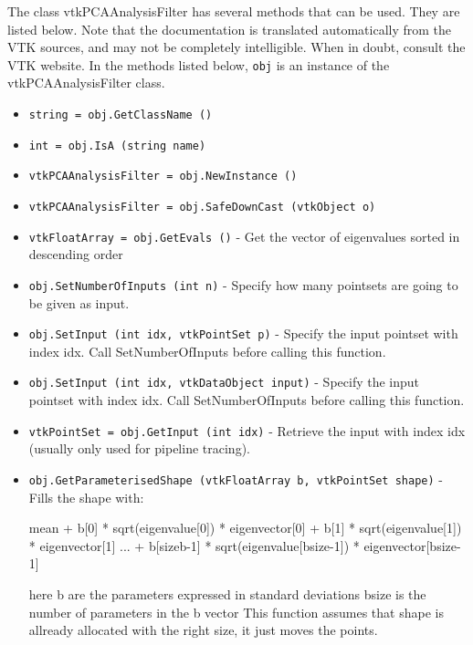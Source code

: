 The class vtkPCAAnalysisFilter has several methods that can be used.
  They are listed below.
Note that the documentation is translated automatically from the VTK sources,
and may not be completely intelligible.  When in doubt, consult the VTK website.
In the methods listed below, \verb|obj| is an instance of the vtkPCAAnalysisFilter class.
\begin{itemize}
\item  \verb|string = obj.GetClassName ()|

\item  \verb|int = obj.IsA (string name)|

\item  \verb|vtkPCAAnalysisFilter = obj.NewInstance ()|

\item  \verb|vtkPCAAnalysisFilter = obj.SafeDownCast (vtkObject o)|

\item  \verb|vtkFloatArray = obj.GetEvals ()| -  Get the vector of eigenvalues sorted in descending order

\item  \verb|obj.SetNumberOfInputs (int n)| -  Specify how many pointsets are going to be given as input.

\item  \verb|obj.SetInput (int idx, vtkPointSet p)| -  Specify the input pointset with index idx.
 Call SetNumberOfInputs before calling this function.

\item  \verb|obj.SetInput (int idx, vtkDataObject input)| -  Specify the input pointset with index idx.
 Call SetNumberOfInputs before calling this function.

\item  \verb|vtkPointSet = obj.GetInput (int idx)| -  Retrieve the input with index idx (usually only used for pipeline
 tracing).

\item  \verb|obj.GetParameterisedShape (vtkFloatArray b, vtkPointSet shape)| -  Fills the shape with:

 mean + b[0] * sqrt(eigenvalue[0]) * eigenvector[0]
      + b[1] * sqrt(eigenvalue[1]) * eigenvector[1]
 ...
      + b[sizeb-1] * sqrt(eigenvalue[bsize-1]) * eigenvector[bsize-1]

 here b are the parameters expressed in standard deviations
 bsize is the number of parameters in the b vector
 This function assumes that shape is allready allocated
 with the right size, it just moves the points.


\end{itemize}
